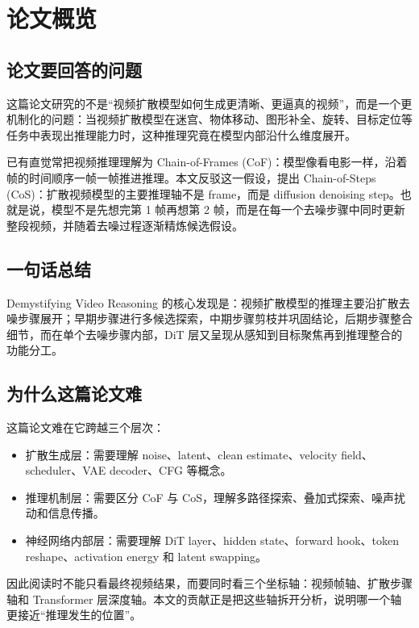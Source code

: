 \section{论文概览}

\subsection{论文要回答的问题}

这篇论文研究的不是“视频扩散模型如何生成更清晰、更逼真的视频”，而是一个更机制化的问题：当视频扩散模型在迷宫、物体移动、图形补全、旋转、目标定位等任务中表现出推理能力时，这种推理究竟在模型内部沿什么维度展开。

已有直觉常把视频推理理解为 Chain-of-Frames (CoF)：模型像看电影一样，沿着帧的时间顺序一帧一帧推进推理。本文反驳这一假设，提出 Chain-of-Steps (CoS)：扩散视频模型的主要推理轴不是 frame，而是 diffusion denoising step。也就是说，模型不是先想完第 1 帧再想第 2 帧，而是在每一个去噪步骤中同时更新整段视频，并随着去噪过程逐渐精炼候选假设。

\subsection{一句话总结}

Demystifying Video Reasoning 的核心发现是：视频扩散模型的推理主要沿扩散去噪步骤展开；早期步骤进行多候选探索，中期步骤剪枝并巩固结论，后期步骤整合细节，而在单个去噪步骤内部，DiT 层又呈现从感知到目标聚焦再到推理整合的功能分工。

\subsection{为什么这篇论文难}

这篇论文难在它跨越三个层次：

\begin{itemize}
    \item 扩散生成层：需要理解 noise、latent、clean estimate、velocity field、scheduler、VAE decoder、CFG 等概念。
    \item 推理机制层：需要区分 CoF 与 CoS，理解多路径探索、叠加式探索、噪声扰动和信息传播。
    \item 神经网络内部层：需要理解 DiT layer、hidden state、forward hook、token reshape、activation energy 和 latent swapping。
\end{itemize}

因此阅读时不能只看最终视频结果，而要同时看三个坐标轴：视频帧轴、扩散步骤轴和 Transformer 层深度轴。本文的贡献正是把这些轴拆开分析，说明哪一个轴更接近“推理发生的位置”。


